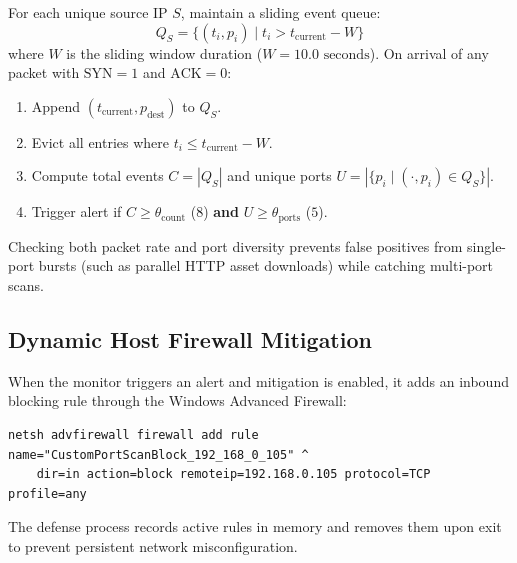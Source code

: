 \documentclass[11pt,a4paper]{article}
\begin{document}
\begin{summarybox}
For each unique source IP $S$, maintain a sliding event queue:
\begin{equation*}
Q_S = \{ (t_i, p_i) \mid t_i > t_{\text{current}} - W \}
\end{equation*}
where $W$ is the sliding window duration ($W = 10.0\text{ seconds}$). On arrival of any packet with $\text{SYN}=1$ and $\text{ACK}=0$:
\begin{enumerate}[nosep, leftmargin=1.4em]
    \item Append $(t_{\text{current}}, p_{\text{dest}})$ to $Q_S$.
    \item Evict all entries where $t_i \le t_{\text{current}} - W$.
    \item Compute total events $C = |Q_S|$ and unique ports $U = |\{p_i \mid (\cdot, p_i) \in Q_S\}|$.
    \item Trigger alert if $C \ge \theta_{\text{count}}$ ($8$) \textbf{and} $U \ge \theta_{\text{ports}}$ ($5$).
\end{enumerate}
\end{summarybox}

Checking both packet rate and port diversity prevents false positives from single-port bursts (such as parallel HTTP asset downloads) while catching multi-port scans.

\subsection{Dynamic Host Firewall Mitigation}
When the monitor triggers an alert and mitigation is enabled, it adds an inbound blocking rule through the Windows Advanced Firewall:

\begin{terminalbox}
\begin{verbatim}
netsh advfirewall firewall add rule name="CustomPortScanBlock_192_168_0_105" ^
    dir=in action=block remoteip=192.168.0.105 protocol=TCP profile=any
\end{verbatim}
\end{terminalbox}

The defense process records active rules in memory and removes them upon exit to prevent persistent network misconfiguration.
\end{document}
